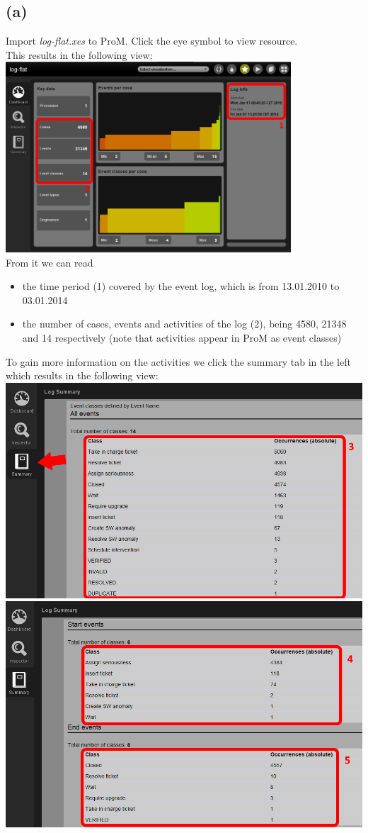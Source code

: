 \documentclass[../../main.tex]{subfiles}
\begin{document}
\subsection*{(a)}
Import \textit{log-flat.xes} to ProM.
Click the eye symbol to view resource. \\
This results in the following view:\\
\includegraphics[width=0.8\textwidth]{img/ProM_a_overview_2.png}\\
From it we can read
\begin{itemize}
\item the time period (1) covered by the event log, which is from 13.01.2010 to 03.01.2014
\item the number of cases, events and activities of the log (2), being 4580, 21348 and 14 respectively (note that activities appear in ProM as event classes)
\end{itemize}
To gain more information on the activities we click the summary tab in the left which results in the following view:\\
\includegraphics[width=0.5\columnwidth]{img/ProM_a_summary.png}
\includegraphics[width=0.5\columnwidth]{img/ProM_a_summary_2.png}\\
\end{document}
